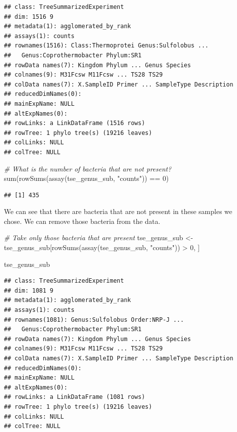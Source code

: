\documentclass[
]{book}
\newenvironment{Shaded}{\begin{snugshade}}{\end{snugshade}}
\newcommand{\CommentTok}[1]{\textcolor[rgb]{0.56,0.35,0.01}{\textit{#1}}}
\newcommand{\DecValTok}[1]{\textcolor[rgb]{0.00,0.00,0.81}{#1}}
\newcommand{\FunctionTok}[1]{\textcolor[rgb]{0.00,0.00,0.00}{#1}}
\newcommand{\NormalTok}[1]{#1}
\newcommand{\OtherTok}[1]{\textcolor[rgb]{0.56,0.35,0.01}{#1}}
\newcommand{\SpecialCharTok}[1]{\textcolor[rgb]{0.00,0.00,0.00}{#1}}
\newcommand{\StringTok}[1]{\textcolor[rgb]{0.31,0.60,0.02}{#1}}
\begin{document}
\begin{verbatim}
## class: TreeSummarizedExperiment 
## dim: 1516 9 
## metadata(1): agglomerated_by_rank
## assays(1): counts
## rownames(1516): Class:Thermoprotei Genus:Sulfolobus ...
##   Genus:Coprothermobacter Phylum:SR1
## rowData names(7): Kingdom Phylum ... Genus Species
## colnames(9): M31Fcsw M11Fcsw ... TS28 TS29
## colData names(7): X.SampleID Primer ... SampleType Description
## reducedDimNames(0):
## mainExpName: NULL
## altExpNames(0):
## rowLinks: a LinkDataFrame (1516 rows)
## rowTree: 1 phylo tree(s) (19216 leaves)
## colLinks: NULL
## colTree: NULL
\end{verbatim}

\begin{Shaded}
\begin{Highlighting}[]
\CommentTok{\# What is the number of bacteria that are not present?}
\FunctionTok{sum}\NormalTok{(}\FunctionTok{rowSums}\NormalTok{(}\FunctionTok{assay}\NormalTok{(tse\_genus\_sub, }\StringTok{"counts"}\NormalTok{)) }\SpecialCharTok{==} \DecValTok{0}\NormalTok{)}
\end{Highlighting}
\end{Shaded}

\begin{verbatim}
## [1] 435
\end{verbatim}

We can see that there are bacteria that are not present in these samples we chose.
We can remove those bacteria from the data.

\begin{Shaded}
\begin{Highlighting}[]
\CommentTok{\# Take only those bacteria that are present}
\NormalTok{tse\_genus\_sub }\OtherTok{\textless{}{-}}\NormalTok{ tse\_genus\_sub[}\FunctionTok{rowSums}\NormalTok{(}\FunctionTok{assay}\NormalTok{(tse\_genus\_sub, }\StringTok{"counts"}\NormalTok{)) }\SpecialCharTok{\textgreater{}} \DecValTok{0}\NormalTok{, ]}

\NormalTok{tse\_genus\_sub}
\end{Highlighting}
\end{Shaded}

\begin{verbatim}
## class: TreeSummarizedExperiment 
## dim: 1081 9 
## metadata(1): agglomerated_by_rank
## assays(1): counts
## rownames(1081): Genus:Sulfolobus Order:NRP-J ...
##   Genus:Coprothermobacter Phylum:SR1
## rowData names(7): Kingdom Phylum ... Genus Species
## colnames(9): M31Fcsw M11Fcsw ... TS28 TS29
## colData names(7): X.SampleID Primer ... SampleType Description
## reducedDimNames(0):
## mainExpName: NULL
## altExpNames(0):
## rowLinks: a LinkDataFrame (1081 rows)
## rowTree: 1 phylo tree(s) (19216 leaves)
## colLinks: NULL
## colTree: NULL
\end{verbatim}
\end{document}
